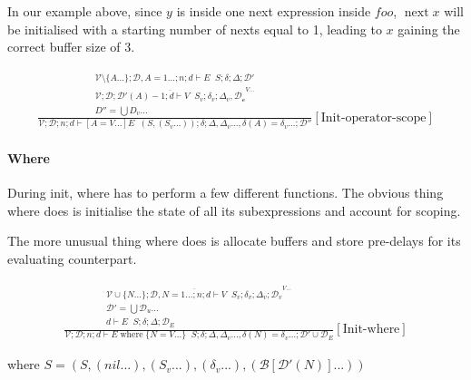 \documentclass{scrartcl}
\DeclareMathOperator{\where}{where}
\DeclareMathOperator{\nextop}{next}
\DeclareMathOperator{\initrel}{\overset{init}{\Rightarrow}}
\begin{document}
    In our example above, since $y$ is inside one next expression inside $foo$, $\nextop x$ will be initialised  with a starting number of nexts equal to 1, leading to $x$ gaining the correct buffer size of 3.
    
    \begin{align*}
    \frac{
        \begin{matrix}
        \mathcal{V} \setminus \{A...\}; \mathcal{D}, A=1...; n; d \vdash E \initrel S; \delta; \Delta; \mathcal{D}' \\
        \overline{\mathcal{V}; \mathcal{D}; \mathcal{D}'(A)-1; d \vdash V \initrel S_v; \delta_v; \Delta_v, \mathcal{D_v}}^{V...} \\
        D'' = \bigcup D_v...
        \end{matrix}
    }{
        \mathcal{V}; \mathcal{D}; n; d \vdash [A=V...]E \initrel (S, (S_v...)); \delta; \Delta, \Delta_v..., \delta(A)=\delta_v...; \mathcal{D}''
    }[\text{Init-operator-scope}]
    \end{align*}
    
    \paragraph{Where}
    
    During init, where has to perform a few different functions. The obvious thing where does is initialise the state of all its subexpressions and account for scoping.
    
    The more unusual thing where does is allocate buffers and store pre-delays for its evaluating counterpart.
    
    \begin{align*}
    \frac{
        \begin{matrix}
        \overline{\mathcal{V} \cup \{N...\}; \mathcal{D}, N=1...; n; d \vdash V \initrel S_v; \delta_v; \Delta_v; \mathcal{D}_v}^{V...} \\
        \mathcal{D}' = \bigcup \mathcal{D}_u... \\
        d \vdash E \initrel S; \delta; \Delta; \mathcal{D}_E
        \end{matrix}
    }{
        \mathcal{V}; \mathcal{D}; n; d \vdash E \where \{ N=V... \} \initrel S; \delta; \Delta, \Delta_v..., \delta(N)=\delta_v...; \mathcal{D}' \cup \mathcal{D}_E
    }[\text{Init-where}]
    \end{align*}
    
    where $S = (S, (nil...), (S_v...), (\delta_v...), (\mathcal{B}[\mathcal{D}'(N)]...))$
    
\end{document}
